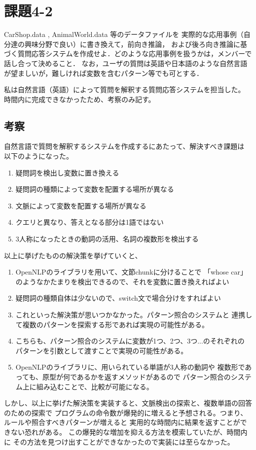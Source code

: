 \documentclass{jarticle}
\begin{document}
\section{課題4-2}
\begin{screen}
    CarShop.data , AnimalWorld.data 等のデータファイルを
    実際的な応用事例（自分達の興味分野で良い）に書き換えて，前向き推論，
    および後ろ向き推論に基づく質問応答システムを作成せよ．どのような応用事例を扱うかは，メンバーで話し合って決めること．
    なお，ユーザの質問は英語や日本語のような自然言語が望ましいが，難しければ変数を含むパターン等でも可とする．
\end{screen}
    私は自然言語（英語）によって質問を解釈する質問応答システムを担当した。
    時間内に完成できなかったため、考察のみ記す。

\subsection{考察}
    自然言語で質問を解釈するシステムを作成するにあたって、解決すべき課題は
    以下のようになった。
\begin{enumerate}
    \item 疑問詞を検出し変数に置き換える
    \item 疑問詞の種類によって変数を配置する場所が異なる
    \item 文脈によって変数を配置する場所が異なる
    \item クエリと異なり、答えとなる部分は1語ではない
    \item 3人称になったときの動詞の活用、名詞の複数形を検出する
\end{enumerate}
    以上に挙げたものの解決策を挙げていくと、
\begin{enumerate}
    \item OpenNLPのライブラリを用いて、文節chunkに分けることで
        「whose car」のようなかたまりを検出できるので、それを変数に置き換えればよい
    \item 疑問詞の種類自体は少ないので、switch文で場合分けをすればよい
    \item これといった解決策が思いつかなかった。パターン照合のシステムと
        連携して複数のパターンを探索する形であれば実現の可能性がある。
    \item こちらも、パターン照合のシステムに変数が1つ、2つ、3つ...のそれぞれの
        パターンを引数として渡すことで実現の可能性がある。
    \item OpenNLPのライブラリに、用いられている単語が3人称の動詞や
        複数形であっても、原型が何であるかを返すメソッドがあるので
        パターン照合のシステム上に組み込むことで、比較が可能になる。
\end{enumerate}
    しかし、以上に挙げた解決策を実装すると、文脈検出の探索と、複数単語の回答のための探索で
    プログラムの命令数が爆発的に増えると予想される。つまり、ルールや照合すべきパターンが増えると
    実用的な時間内に結果を返すことができない恐れがある。
    この爆発的な増加を抑える方法を模索していたが、時間内に
    その方法を見つけ出すことができなかったので実装には至らなかった。
\end{document}
